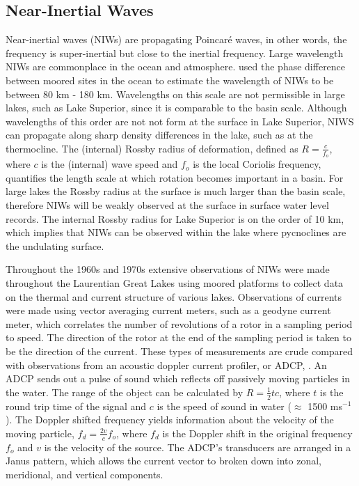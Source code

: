 \subsection{Near-Inertial Waves}
Near-inertial waves (NIWs) are propagating Poincar\'{e} waves, in other words, the frequency is super-inertial but close to the inertial frequency. 
Large wavelength NIWs are commonplace in the ocean and atmosphere.  
\citet{hongbo_et_al_1995} used the phase difference between moored sites in the ocean to estimate the wavelength of NIWs to be between 80 km - 180 km. 
Wavelengths on this scale are not permissible in large lakes, such as Lake Superior, since it is comparable to the basin scale. Although wavelengths of this order
are not not form at the surface in Lake Superior, NIWS can propagate along sharp density differences in the lake, such as at the thermocline. The (internal) Rossby radius of deformation, 
defined as $R=\frac{c}{f_o}$,  where $c$ is the (internal) wave speed and $f_o$ is the local Coriolis frequency, quantifies the length scale at which rotation becomes important in a basin. 
 For large lakes the Rossby radius at the surface is much larger than the basin scale, therefore
NIWs will be weakly observed at the surface in surface water level records. The internal Rossby radius for Lake Superior is on the order of 10 km, which implies that NIWs can be observed 
within the lake where pycnoclines are the undulating surface. 

Throughout the 1960s and 1970s extensive observations of NIWs were made throughout the Laurentian Great Lakes using moored platforms to
collect data on the thermal and current structure of various lakes. Observations of currents were made using vector averaging current meters, such as a geodyne current meter, 
which correlates the number of  revolutions of a rotor in a sampling period to speed.  The direction of the rotor at the end of the sampling
period is taken to be the direction of the current. These types of measurements are crude compared with observations from an acoustic doppler current profiler, or ADCP, \citep{bugnon_1991}.  
An ADCP sends out a pulse of sound which reflects off passively moving particles in the water. The range of the object can be calculated by $R=\frac{1}{2}tc$, where $t$ is the 
round trip time of the signal and $c$ is the speed of sound in water ($\approx$ 1500 ms$^{-1}$). The Doppler shifted frequency yields 
information about the velocity of the moving particle, $f_d=\frac{2v}{c}f_o$, where $f_d$ is the Doppler shift in the original frequency $f_o$ and $v$ is the velocity of the source. 
The ADCP's transducers are arranged in a Janus pattern, which allows the current vector to broken down into zonal, meridional, and vertical 
components. 


